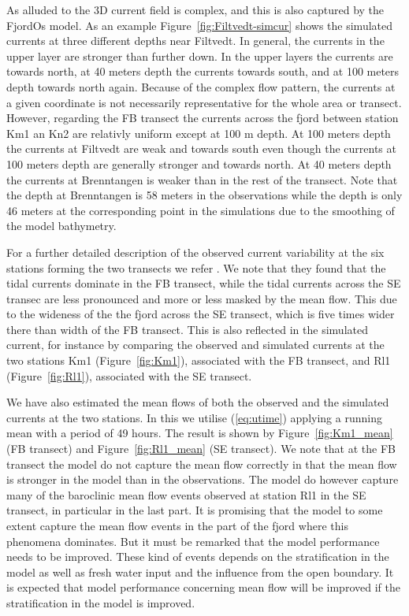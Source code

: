 As alluded to the 3D current field is complex, and this is also captured by the FjordOs model. As an example Figure~\ref{fig:Filtvedt-simcur} shows the simulated currents at three different depths near Filtvedt. In general, the currents in the upper layer are stronger than further down. In the upper layers the currents are towards north, at 40 meters depth the currents towards south, and at 100 meters depth towards north again. Because of the complex flow pattern, the currents at a given coordinate is not necessarily representative for the whole area or transect. However, regarding the FB transect the currents across the fjord between station Km1 an Kn2 are relativly uniform except at 100 m depth. At 100 meters depth the currents at Filtvedt are weak and towards south even though the currents at 100 meters depth are generally stronger and towards north. At 40 meters depth the currents at Brenntangen is weaker than in the rest of the transect. Note that the depth at Brenntangen is 58 meters in the observations while the depth is only 46 meters at the corresponding point in the simulations due to the smoothing of the model bathymetry. 


For a further detailed description of the observed current variability at the six stations forming the two transects we refer \cite{staalstrom:2015}. We note that they found that the tidal currents dominate in the FB transect, while the tidal currents across the SE transec are less pronounced and more or less masked by the mean flow. This due to the wideness of the the fjord across the SE transect, which is five times wider there than width of the FB transect. This is also reflected in the simulated current, for instance by comparing the observed and simulated currents at the two stations Km1 (Figure~\ref{fig:Km1}), associated with the FB transect, and Rl1 (Figure~\ref{fig:Rl1}), associated with the SE transect.



We have also estimated the mean flows of both the observed and the simulated currents at the two stations. In this we utilise (\ref{eq:utime}) applying a running mean with a period of 49 hours. The result is shown by Figure~\ref{fig:Km1_mean} (FB transect) and Figure~\ref{fig:Rl1_mean} (SE transect). We note that at the FB transect the model do not capture the mean flow correctly in that the mean flow is stronger in the model than in the observations. The model do however capture many of the baroclinic mean flow events observed at station Rl1 in the SE transect, in particular in the last part. It is promising that the model to some extent capture the mean flow events in the part of the fjord where this phenomena dominates. But it must be remarked that the model performance needs to be improved. These kind of events depends on the stratification in the model as well as fresh water input and the influence from the open boundary. It is expected that model performance concerning mean flow will be improved if the stratification in the model is improved. 



